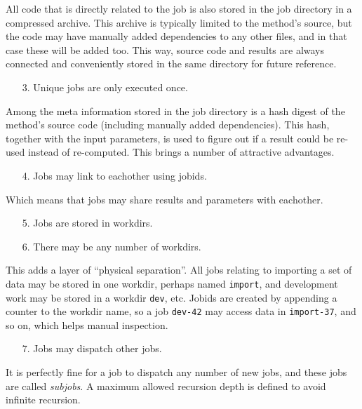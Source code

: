 All code that is directly related to the job is also stored in the job
directory in a compressed archive.  This archive is typically limited
to the method's source, but the code may have manually added
dependencies to any other files, and in that case these will be added
too.  This way, source code and results are always connected and
conveniently stored in the same directory for future reference.
\begin{itemize}
\item[3.]  Unique jobs are only executed once.
\end{itemize}
Among the meta information stored in the job directory is a hash
digest of the method's source code (including manually added
dependencies).  This hash, together with the input parameters, is used
to figure out if a result could be re-used instead of re-computed.
This brings a number of attractive advantages.
\begin{itemize}
\item[4.]  Jobs may link to eachother using jobids.
\end{itemize}
Which means that jobs may share results and parameters with eachother.
\begin{itemize}
\item[5.]  Jobs are stored in workdirs.
\item[6.]  There may be any number of workdirs.
\end{itemize}
This adds a layer of ``physical separation''.  All jobs relating to
importing a set of data may be stored in one workdir, perhaps named
\texttt{import}, and development work may be stored in a workdir
\texttt{dev}, etc.  Jobids are created by appending a counter to the
workdir name, so a job \texttt{dev-42} may access data in
\texttt{import-37}, and so on, which helps manual inspection.
\begin{itemize}
\item[7.] Jobs may dispatch other jobs.
\end{itemize}
It is perfectly fine for a job to dispatch any number of new jobs, and
these jobs are called \textsl{subjobs}.  A maximum allowed recursion
depth is defined to avoid infinite recursion.


